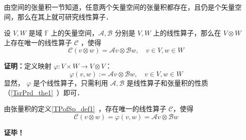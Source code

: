 

由空间的张量积一节知道，任意两个矢量空间的张量积都存在，且仍是个矢量空间，那么在其上就可研究线性算子．
\begin{theorem}{}
设 $V,W$ 是域 $\mathbb F$ 上的矢量空间，$\mathcal A,\mathcal B$ 分别是 $V,W$ 上的线性算子，那么在 $V\otimes W$ 上存在唯一的线性算子 $\mathcal C$ ，使得
\begin{equation}\label{TPofLO_eq1}
\mathcal C(v\otimes w)=\mathcal A v\otimes \mathcal B w,\quad v\in V,w\in W
\end{equation}
\end{theorem}
\textbf{证明：}定义映射 $\varphi:V\times W\rightarrow V\otimes V$：
\begin{equation}
\varphi(v,w):=\mathcal A v\otimes \mathcal B w,\quad v\in V,w\in W
\end{equation}
显然， $\varphi$ 是个线性算子，只需利用 $\mathcal A,\mathcal B$ 是线性算子和张量积的性质（\autoref{TsrPrd_the1}~）即可．

由张量积的定义\autoref{TPofSp_def1}~，存在唯一的线性算子 $\mathcal C$，使得
\begin{equation}
\mathcal C(v\otimes w)=\varphi(v,w)=\mathcal A v\otimes \mathcal B w
\end{equation}

\textbf{证毕！}

